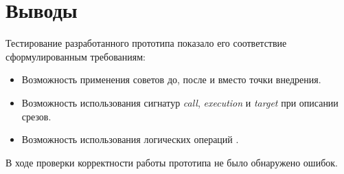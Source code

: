 \section{Выводы}
\label{sec:ch5_conclusion}
Тестирование разработанного прототипа показало его соответствие сформулированным требованиям:
\begin{itemize}
	\item Возможность применения советов до, после и вместо точки внедрения.
	\item Возможность использования сигнатур \textit{call}, \textit{execution} и \textit{target} при описании срезов.
	\item Возможность использования логических операций   .
\end{itemize}
В ходе проверки корректности работы прототипа не было обнаружено ошибок.
